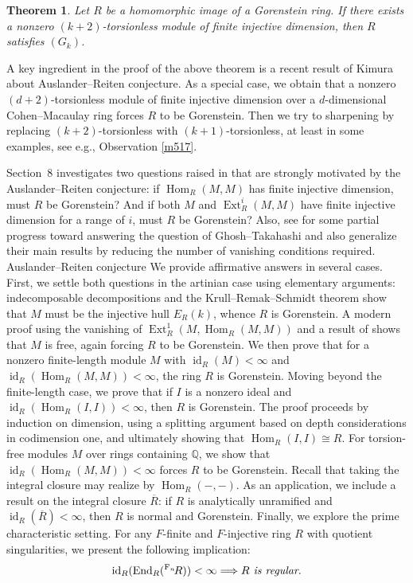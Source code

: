 \documentclass[10. pt,a4paper]{amsart}
\newtheorem{theorem}{Theorem}[section]
\theoremstyle{definition}
\theoremstyle{remark}
\newcommand{\F}{\operatorname{F}}
\newcommand{\End}{\operatorname{End}}
\newcommand{\id}{\operatorname{id}}
\newcommand{\Ext}{\operatorname{Ext}}
\newcommand{\Hom}{\operatorname{Hom}}
\begin{document}
\begin{theorem}
	Let $R$ be a homomorphic image of a Gorenstein ring. If there exists a nonzero $(k+2)$-torsionless module of finite injective dimension, then $R$ satisfies $(G_k)$.
\end{theorem}

A key ingredient in the proof of the above theorem is a recent result of Kimura \cite{kim} about  Auslander--Reiten conjecture. As a special case, we obtain that a nonzero $(d+2)$-torsionless module of finite injective dimension over a $d$-dimensional Cohen--Macaulay ring forces $R$ to be Gorenstein.
Then we try to sharpening by replacing $(k+2)$-torsionless with $(k+1)$-torsionless, at least in some examples, see e.g., {Observation} \ref{m517}.



Section~8 investigates two questions raised in \cite{q1,q2} that are strongly motivated by the Auslander--Reiten conjecture: if $\Hom_R(M,M)$ has finite injective dimension, must $R$ be Gorenstein? And if both $M$ and $\Ext^i_R(M,M)$ have finite injective dimension for a range of $i$, must $R$ be Gorenstein? Also, see \cite{dey} for  some partial progress toward answering the question of Ghosh--Takahashi and also generalize their main results by reducing the number of vanishing conditions required. Auslander--Reiten conjecture We provide affirmative answers in several cases.
First, we settle both questions in the artinian case using elementary arguments: indecomposable decompositions and the Krull--Remak--Schmidt theorem show that $M$ must be the injective hull $E_R(k)$, whence $R$ is Gorenstein. A modern proof using the vanishing of $\Ext^1_R(M,\Hom_R(M,M))$ and a result of \cite{ta} shows that $M$ is free, again forcing $R$ to be Gorenstein.
We then prove that for a nonzero finite-length module $M$ with $\id_R(M)<\infty$ and $\id_R(\Hom_R(M,M))<\infty$, the ring $R$ is Gorenstein. 
Moving beyond the finite-length case, we prove that if $I$ is a nonzero ideal and $\id_R(\Hom_R(I,I))<\infty$, then $R$ is Gorenstein. The proof proceeds by induction on dimension, using a splitting argument based on depth considerations in codimension one, and ultimately showing that $\Hom_R(I,I)\cong R$. For torsion-free modules $M$ over rings containing $\mathbb{Q}$, we show that $\id_R(\Hom_R(M,M))<\infty$ forces $R$ to be Gorenstein. Recall that taking the integral closure  may realize by $\Hom_R(-,-)$.
As an application, we include a result on the integral closure $\overline{R}$: if $R$ is analytically unramified and $\id_R(\overline{R})<\infty$, then $R$ is normal and Gorenstein. 
Finally, we explore the prime characteristic setting. 
For any  $F$-finite and $F$-injective ring $R$ with quotient singularities, we present the following implication:
	\[
	\id_R(\End_R(\up{\F_n}R))<\infty\Longrightarrow   R \emph{ is regular}.
	\]
 
\end{document}
